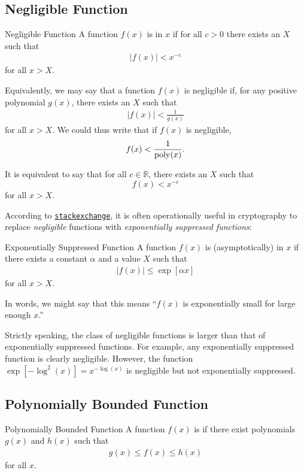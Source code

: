 \subsection{Negligible Function}
\begin{definition}{Negligible Function}{}
A function \(f(x)\) is  in \(x\) if for all \(c > 0\) there exists an \(X\) such that
\begin{align}
	|f(x)| < x^{-c}
\end{align}
for all \(x > X\).
\end{definition}
Equivalently, we may say that a function \(f(x)\) is negligible if, for any positive polynomial \(g(x)\), there exists an \(X\) such that
\begin{align}
	|f(x)| < \frac{1}{g(x)}
\end{align}
for all \(x > X\). We could thus write that if \(f(x)\) is negligible,
\begin{equation}
	f(x) < \frac{1}{{\rm poly}(x)}
	.
\end{equation}

It is equivalent to say that for all \(c \in \mathbb{R}\), there exists an \(X\) such that
\begin{equation}
    f(x) < x^{-c}
\end{equation}
for all \(x > X\).

According to \href{https://crypto.stackexchange.com/questions/56319/property-of-negligible-functions}{\texttt{stackexchange}}, it is often operationally useful in cryptography to replace \textit{negligible} functions with \textit{exponentially suppressed functions}:
\begin{definition}{Exponentially Suppressed Function}{}
A function \(f(x)\) is (asymptotically)  in \(x\) if there exists a constant \(\alpha\) and a value \(X\) such that 
\begin{align}
	|f(x)| \leq \exp\left[\alpha x\right]
\end{align}
for all \(x > X\).
\end{definition}
In words, we might say that this means ``\(f(x)\) is exponentially small for large enough \(x\).''

Strictly speaking, the class of negligible functions is larger than that of exponentially suppressed functions. For example, any exponentially suppressed function is clearly negligible. However, the function \(\exp[-\log^2(x)] = x^{-\log(x)}\) is negligible but not exponentially suppressed.

\subsection{Polynomially Bounded Function}
\begin{definition}{Polynomially Bounded Function}{}
A function \(f(x)\) is  if there exist polynomials \(g(x)\) and \(h(x)\) such that
\begin{align}
	g(x) \leq f(x) \leq h(x)
\end{align}
for all \(x\).
\end{definition}

